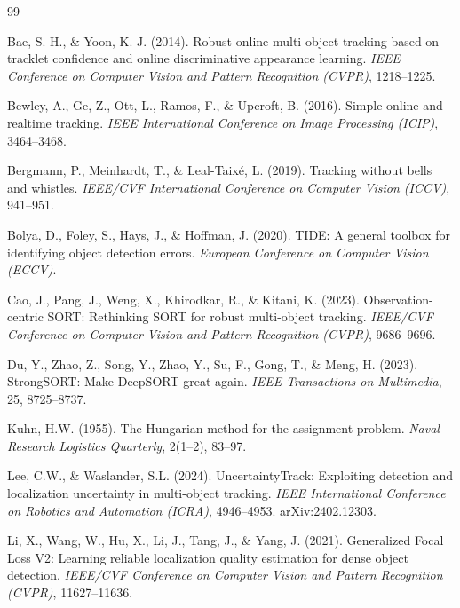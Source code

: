 \documentclass[12pt,a4paper,oneside]{report}
\begin{document}
\begin{thebibliography}{99}

Bae, S.-H., \& Yoon, K.-J. (2014).
Robust online multi-object tracking based on tracklet confidence and online discriminative appearance learning.
\textit{IEEE Conference on Computer Vision and Pattern Recognition (CVPR)}, 1218--1225.

Bewley, A., Ge, Z., Ott, L., Ramos, F., \& Upcroft, B. (2016).
Simple online and realtime tracking.
\textit{IEEE International Conference on Image Processing (ICIP)}, 3464--3468.

Bergmann, P., Meinhardt, T., \& Leal-Taix\'e, L. (2019).
Tracking without bells and whistles.
\textit{IEEE/CVF International Conference on Computer Vision (ICCV)}, 941--951.

Bolya, D., Foley, S., Hays, J., \& Hoffman, J. (2020).
TIDE: A general toolbox for identifying object detection errors.
\textit{European Conference on Computer Vision (ECCV)}.

Cao, J., Pang, J., Weng, X., Khirodkar, R., \& Kitani, K. (2023).
Observation-centric SORT: Rethinking SORT for robust multi-object tracking.
\textit{IEEE/CVF Conference on Computer Vision and Pattern Recognition (CVPR)}, 9686--9696.

Du, Y., Zhao, Z., Song, Y., Zhao, Y., Su, F., Gong, T., \& Meng, H. (2023).
StrongSORT: Make DeepSORT great again.
\textit{IEEE Transactions on Multimedia}, 25, 8725--8737.

Kuhn, H.W. (1955).
The Hungarian method for the assignment problem.
\textit{Naval Research Logistics Quarterly}, 2(1--2), 83--97.

Lee, C.W., \& Waslander, S.L. (2024).
UncertaintyTrack: Exploiting detection and localization uncertainty in multi-object tracking.
\textit{IEEE International Conference on Robotics and Automation (ICRA)}, 4946--4953. arXiv:2402.12303.

Li, X., Wang, W., Hu, X., Li, J., Tang, J., \& Yang, J. (2021).
Generalized Focal Loss V2: Learning reliable localization quality estimation for dense object detection.
\textit{IEEE/CVF Conference on Computer Vision and Pattern Recognition (CVPR)}, 11627--11636.


\end{thebibliography}
\end{document}
